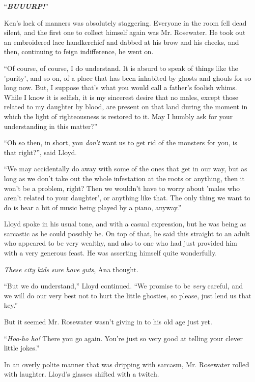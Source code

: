 \documentclass[
]{article}
\begin{document}
``\emph{\textbf{BUUURP!}}''

Ken's lack of manners was absolutely staggering. Everyone in the room
fell dead silent, and the first one to collect himself again was Mr.
Rosewater. He took out an embroidered lace handkerchief and dabbed at
his brow and his cheeks, and then, continuing to feign indifference, he
went on.

``Of course, of course, I do understand. It is absurd to speak of things
like the 'purity', and so on, of a place that has been inhabited by
ghosts and ghouls for so long now. But, I suppose that's what you would
call a father's foolish whims. While I know it is selfish, it is my
sincerest desire that no males, except those related to my daughter by
blood, are present on that land during the moment in which the light of
righteousness is restored to it. May I humbly ask for your understanding
in this matter?''

``Oh so then, in short, you \emph{don't} want us to get rid of the
monsters for you, is that right?'', said Lloyd.

``We may accidentally do away with some of the ones that get in our way,
but as long as we don't take out the whole infestation at the roots or
anything, then it won't be a problem, right? Then we wouldn't have to
worry about 'males who aren't related to your daughter', or anything
like that. The only thing we want to do is hear a bit of music being
played by a piano, anyway.''

Lloyd spoke in his usual tone, and with a casual expression, but he was
being as sarcastic as he could possibly be. On top of that, he said this
straight to an adult who appeared to be very wealthy, and also to one
who had just provided him with a very generous feast. He was asserting
himself quite wonderfully.

\emph{These city kids sure have guts}, Ana thought.

``But we do understand,'' Lloyd continued. ``We promise to be
\emph{very} careful, and we will do our very best not to hurt the little
ghosties, so please, just lend us that key.''

But it seemed Mr. Rosewater wasn't giving in to his old age just yet.

``\emph{Hoo-ho ho!} There you go again. You're just so very good at
telling your clever little jokes.''

In an overly polite manner that was dripping with sarcasm, Mr. Rosewater
rolled with laughter. Lloyd's glasses shifted with a twitch.
\end{document}
